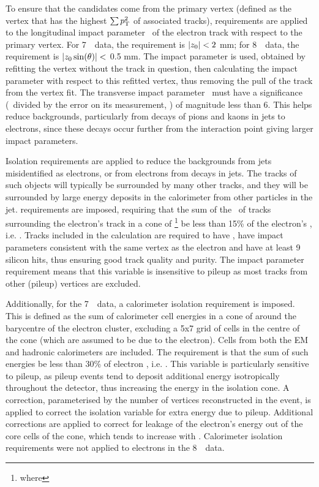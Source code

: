 To ensure that the candidates come from the primary vertex (defined as the
vertex that has the highest $\sum{\ensuremath{p_{\mathrm{T}}}^2}$ of associated tracks), requirements
are applied to the
longitudinal impact parameter \zzero\ of the electron track with respect to the
primary vertex. For 7~\tev\ data, the requirement is $|z_{0}|<2$ mm; for 8~\tev\ data,
the requirement is $|z_{0}\sin(\theta)|<$ 0.5 mm. The  impact
parameter is used, obtained by refitting the vertex without the track in
question, then calculating the impact parameter with respect to this refitted
vertex, thus removing the pull of the track from the vertex fit.  The transverse
impact parameter \dzero\ must have a significance (\dzero\ divided by the error
on its measurement, \dzerosig) of magnitude less than 6. This helps reduce backgrounds,
particularly from decays of pions and kaons in jets to electrons, since these
decays occur further from the interaction point giving larger impact
parameters.

Isolation requirements are applied to reduce the backgrounds from jets 
misidentified as electrons, or from electrons from decays in jets. The tracks of
such objects will
typically be surrounded by many other tracks, and they will be
surrounded by large energy deposits in the calorimeter from other particles in
the jet.  requirements are imposed, requiring that the
sum of the \pt\ of tracks surrounding the electron's track in a cone of
\footnote{where \deltaRdef} be less than 15\% of the electron's \pt, i.e.
. Tracks included in the calculation are required to have
, have impact parameters consistent with the same vertex as the
electron and have at least 9 silicon hits, thus ensuring good track quality and
purity. The impact parameter requirement means that this variable is insensitive
to pileup as most tracks from other (pileup) vertices are excluded.

Additionally, for the 7~\tev\ data, a calorimeter isolation requirement is imposed.
This is defined as the sum of calorimeter cell energies in a cone of
 around the barycentre of the electron cluster, excluding a 5x7
grid of cells in the centre of the cone (which are assumed to be due to the
electron). Cells from both the EM and hadronic calorimeters are included. The
requirement is that the sum of such energies be less than 30\% of electron \et,
i.e. .  This variable is particularly sensitive to pileup,
as pileup events tend to deposit additional energy isotropically throughout the
detector, thus increasing the energy in the isolation cone. A correction,
parameterised by the number of vertices reconstructed in the event, is applied to
correct the isolation variable for extra energy due to pileup.  Additional
corrections are applied to correct for leakage of the electron's energy out of
the core cells of the cone, which tends to increase with \pt. Calorimeter
isolation requirements were not applied to electrons in the 8~\tev\ data.


